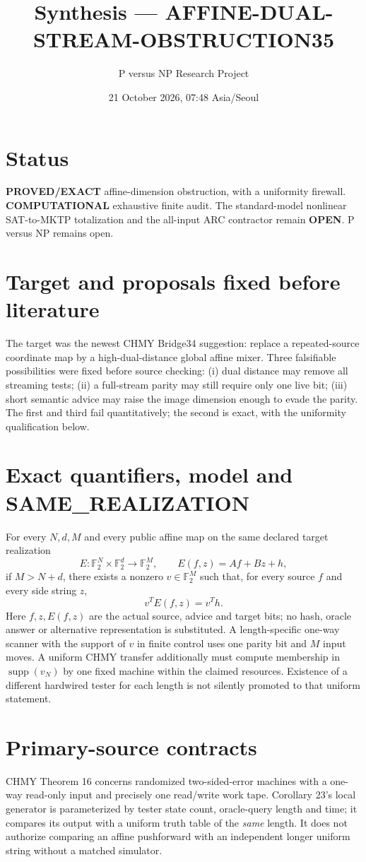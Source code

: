\documentclass[11pt]{article}
\title{Synthesis --- AFFINE-DUAL-STREAM-OBSTRUCTION35}
\author{P versus NP Research Project}
\date{21 October 2026, 07:48 Asia/Seoul}
\begin{document}
\maketitle

\section*{Status}
\textbf{PROVED/EXACT} affine-dimension obstruction, with a uniformity firewall.
\textbf{COMPUTATIONAL} exhaustive finite audit.  The standard-model nonlinear
SAT-to-MKTP totalization and the all-input ARC contractor remain
\textbf{OPEN}.  P versus NP remains open.

\section*{Target and proposals fixed before literature}
The target was the newest CHMY Bridge34 suggestion: replace a repeated-source
coordinate map by a high-dual-distance global affine mixer.  Three falsifiable
possibilities were fixed before source checking: (i) dual distance may remove
all streaming tests; (ii) a full-stream parity may still require only one live
bit; (iii) short semantic advice may raise the image dimension enough to evade
the parity.  The first and third fail quantitatively; the second is exact, with
the uniformity qualification below.

\section*{Exact quantifiers, model and SAME\_REALIZATION}
For every $N,d,M$ and every public affine map on the same declared target
realization
\[
 E:\mathbb F_2^N\times\mathbb F_2^d\longrightarrow\mathbb F_2^M,
 \qquad E(f,z)=Af+Bz+h,
\]
if $M>N+d$, there exists a nonzero $v\in\mathbb F_2^M$ such that, for every
source $f$ and every side string $z$,
\[
 v^T E(f,z)=v^T h.                                           \tag{1}
\]
Here $f,z,E(f,z)$ are the actual source, advice and target bits; no hash,
oracle answer or alternative representation is substituted.  A length-specific
one-way scanner with the support of $v$ in finite control uses one parity bit
and $M$ input moves.  A uniform CHMY transfer additionally must compute
membership in $\operatorname{supp}(v_N)$ by one fixed machine within the
claimed resources.  Existence of a different hardwired tester for each length
is not silently promoted to that uniform statement.

\section*{Primary-source contracts}
CHMY Theorem 16 concerns randomized two-sided-error machines with a one-way
read-only input and precisely one read/write work tape.  Corollary 23's local
generator is parameterized by tester state count, oracle-query length and
time; it compares its output with a uniform truth table of the \emph{same}
length.  It does not authorize comparing an affine pushforward with an
independent longer uniform string without a matched simulator.
\end{document}
